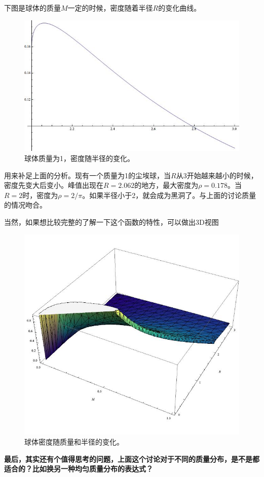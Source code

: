 \documentclass[12pt,a4paper]{article}
\begin{document}
下图是球体的质量$M$一定的时候，密度随着半径$R$的变化曲线。
\begin{figure}[!htbp]
\centering
\includegraphics[width=400pt]{DustBlackHole_FixM.jpg}
\caption{球体质量为1，密度随半径的变化。}\label{fig:3D}
\end{figure}

用来补足上面的分析。现有一个质量为1的尘埃球，当$R$从3开始越来越小的时候，密度先变大后变小。峰值出现在$R=2.062$的地方，最大密度为$\rho=0.178$。当$R=2$时，密度为$\rho=2/\pi$。如果半径小于2，就会成为黑洞了。与上面的讨论质量的情况吻合。


当然，如果想比较完整的了解一下这个函数的特性，可以做出3D视图
\begin{figure}[!htbp]
\centering
\includegraphics[width=400pt]{DustBlackHole_3D.jpg}
\caption{球体密度随质量和半径的变化。}\label{fig:FixM}
\end{figure}


\vspace{3em}


\bf 最后，其实还有个值得思考的问题，上面这个讨论对于不同的质量分布，是不是都适合的？比如换另一种均匀质量分布的表达式？
\end{document}
